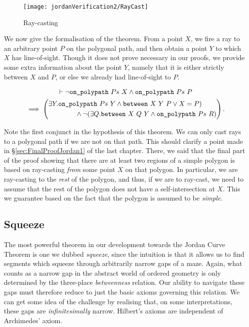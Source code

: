 \begin{figure}
\centering\texttt{[image: jordanVerification2/RayCast]}
\caption{Ray-casting}
\label{fig:RayCast}
\end{figure}

We now give the formalisation of the theorem. From a point $X$, we fire a ray to an arbitrary point $P$ on the polygonal path, and then obtain a point $Y$ to which $X$ has line-of-sight. Though it does not prove necessary in our proofs, we provide some extra information about the point $Y$, namely that it is either strictly between $X$ and $P$, or else we already had line-of-sight to $P$. 

\begin{multline}\label{eq:RayCast}
  \vdash\neg\texttt{on\_polypath}\ Ps\ X \wedge \texttt{on\_polypath}\ Ps\ P\\
  \implies \left(
    \begin{aligned}&\exists Y. \texttt{on\_polypath}\ Ps\ Y \wedge \texttt{between}\ X\ Y\ P \vee X = P)\\
      &\qquad\qquad\wedge \neg(\exists Q. \texttt{between}\ X\ Q\ Y \wedge \texttt{on\_polypath}\ Ps\ R)
    \end{aligned}\right).
\end{multline}

Note the first conjunct in the hypothesis of this theorem. We can only cast rays to a polygonal path if we are not on that path. This should clarify a point made in \S\ref{sec:FinalProofJordan1} of the last chapter. There, we said that the final part of the proof showing that there are at least two regions of a simple polygon is based on ray-casting \emph{from} some point $X$ on that polygon. In particular, we are ray-casting to the \emph{rest} of the polygon, and thus, if we are to ray-cast, we need to assume that the rest of the polygon does not have a self-intersection at $X$. This we guarantee based on the fact that the polygon is assumed to be \emph{simple}.

\subsection{Squeeze}\label{sec:Squeeze}
The most powerful theorem in our development towards the Jordan Curve Theorem is one we dubbed \emph{squeeze}, since the intuition is that it allows us to find segments which squeeze through arbitrarily narrow gaps of a maze. Again, what counts as a narrow gap in the abstract world of ordered geometry is only determined by the three-place \emph{betweenness} relation. Our ability to navigate these gaps must therefore reduce to just the basic axioms governing this relation. We can get some idea of the challenge by realising that, on some interpretations, these gaps are \emph{infinitesimally} narrow. Hilbert's axioms are independent of Archimedes' axiom.

